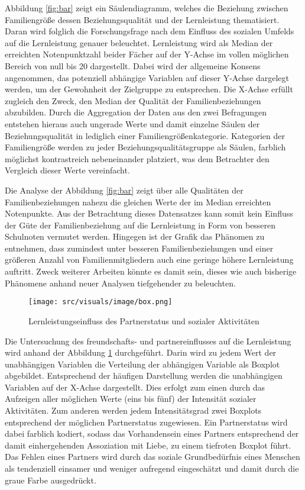 Abbildung \ref{fig:bar} zeigt ein Säulendiagramm, welches die Beziehung zwischen Familiengröße dessen Beziehungsqualität und der Lernleistung thematisiert.
Daran wird folglich die Forschungsfrage nach dem Einfluss des sozialen Umfelds auf die Lernleistung genauer beleuchtet.
Lernleistung wird als Median der erreichten Notenpunktzahl beider Fächer auf der Y-Achse im vollen möglichen Bereich von null bis 20 dargestellt.
Dabei wird der allgemeine Konsens angenommen, das potenziell abhängige Variablen auf dieser Y-Achse dargelegt werden, um der Gewohnheit der Zielgruppe zu entsprechen.
Die X-Achse erfüllt zugleich den Zweck, den Median der Qualität der Familienbeziehungen abzubilden.
Durch die Aggregation der Daten aus den zwei Befragungen entstehen hieraus auch ungerade Werte und damit einzelne Säulen der Beziehungsqualität in lediglich einer Familiengrößenkategorie.
Kategorien der Familiengröße werden zu jeder Beziehungsqualitätsgruppe als Säulen, farblich möglichst kontrastreich nebeneinander platziert, was dem Betrachter den Vergleich dieser Werte vereinfacht. 

Die Analyse der Abbildung \ref{fig:bar} zeigt über alle Qualitäten der Familienbeziehungen nahezu die gleichen Werte der im Median erreichten Notenpunkte.
Aus der Betrachtung dieses Datensatzes kann somit kein Einfluss der Güte der Familienbeziehung auf die Lernleistung in Form von besseren Schulnoten vermutet werden.
Hingegen ist der Grafik das Phänomen zu entnehmen, dass zumindest unter besseren Familienbeziehungen und einer größeren Anzahl von Familienmitgliedern auch eine geringe höhere Lernleistung auftritt.
Zweck weiterer Arbeiten könnte es damit sein, dieses wie auch bisherige Phänomene anhand neuer Analysen tiefgehender zu beleuchten.

\begin{figure}[htb]
    \centering
    \texttt{[image: src/visuals/image/box.png]}
    \caption{Lernleistungseinfluss des Partnerstatus und sozialer Aktivitäten}
    \label{fig:box}
\end{figure}

Die Untersuchung des freundschafts- und partnereinflusses auf die Lernleistung wird anhand der Abbildung \ref{fig:box} durchgeführt.
Darin wird zu jedem Wert der unabhängigen Variablen die Verteilung der abhängigen Variable als Boxplot abgebildet.
Entsprechend der häufigen Darstellung werden die unabhängigen Variablen auf der X-Achse dargestellt.
Dies erfolgt zum einen durch das Aufzeigen aller möglichen Werte (eins bis fünf) der Intensität sozialer Aktivitäten.
Zum anderen werden jedem Intensitätsgrad zwei Boxplots entsprechend der möglichen Partnerstatus zugewiesen.
Ein Partnerstatus wird dabei farblich kodiert, sodass das Vorhandensein eines Partners entsprechend der damit einhergehenden Assoziation mit Liebe, zu einem tiefroten Boxplot führt.
Das Fehlen eines Partners wird durch das soziale Grundbedürfnis eines Menschen als tendenziell einsamer und weniger aufregend eingeschätzt und damit durch die graue Farbe ausgedrückt.

